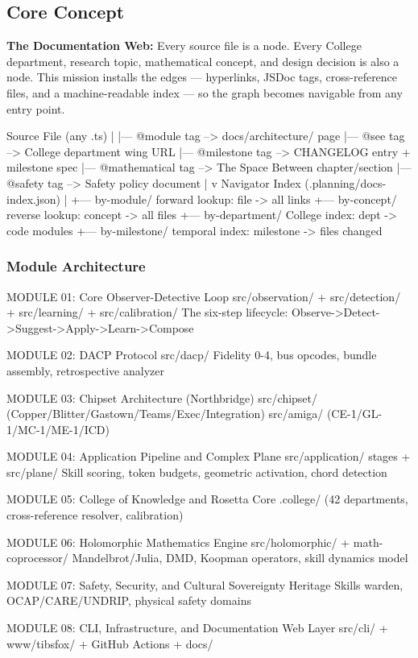 \documentclass[11pt,letterpaper]{article}
\begin{document}
\subsection{Core Concept}

\textbf{The Documentation Web:} Every source file is a node. Every College department, research topic, mathematical concept, and design decision is also a node. This mission installs the edges --- hyperlinks, JSDoc tags, cross-reference files, and a machine-readable index --- so the graph becomes navigable from any entry point.

\begin{asciibox}
Source File (any .ts)
    |
    |--- @module tag         --> docs/architecture/ page
    |--- @see tag            --> College department wing URL
    |--- @milestone tag      --> CHANGELOG entry + milestone spec
    |--- @mathematical tag   --> The Space Between chapter/section
    |--- @safety tag         --> Safety policy document
    |
    v
 Navigator Index (.planning/docs-index.json)
    |
    +--- by-module/          forward lookup: file -> all links
    +--- by-concept/         reverse lookup: concept -> all files
    +--- by-department/      College index: dept -> code modules
    +--- by-milestone/       temporal index: milestone -> files changed
\end{asciibox}

\subsubsection{Module Architecture}

\begin{asciibox}
MODULE 01: Core Observer-Detective Loop
  src/observation/ + src/detection/ + src/learning/ + src/calibration/
  The six-step lifecycle: Observe->Detect->Suggest->Apply->Learn->Compose

MODULE 02: DACP Protocol
  src/dacp/
  Fidelity 0-4, bus opcodes, bundle assembly, retrospective analyzer

MODULE 03: Chipset Architecture (Northbridge)
  src/chipset/ (Copper/Blitter/Gastown/Teams/Exec/Integration)
  src/amiga/ (CE-1/GL-1/MC-1/ME-1/ICD)

MODULE 04: Application Pipeline and Complex Plane
  src/application/ stages + src/plane/
  Skill scoring, token budgets, geometric activation, chord detection

MODULE 05: College of Knowledge and Rosetta Core
  .college/ (42 departments, cross-reference resolver, calibration)

MODULE 06: Holomorphic Mathematics Engine
  src/holomorphic/ + math-coprocessor/
  Mandelbrot/Julia, DMD, Koopman operators, skill dynamics model

MODULE 07: Safety, Security, and Cultural Sovereignty
  Heritage Skills warden, OCAP/CARE/UNDRIP, physical safety domains

MODULE 08: CLI, Infrastructure, and Documentation Web Layer
  src/cli/ + www/tibsfox/ + GitHub Actions + docs/
\end{asciibox}
\end{document}
